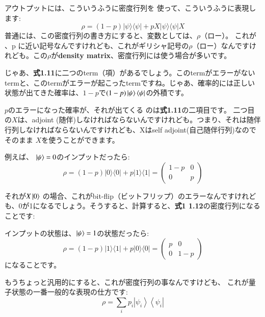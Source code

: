 アウトプットには、こういうふうに密度行列を
使って、こういうふうに表現します:
\begin{equation}
\rho=(1-p)|\psi\rangle\langle\psi|+p X| \psi\rangle\langle\psi| X
\end{equation}
普通には、この密度行列の書き方にすると、変数としては、$\rho$（ロー）。
これが 、p に近い記号なんですけれども、これがギリシャ記号の$\rho$（ロー）なんですけれども。この$\rho$が\textbf{density matrix}、密度行列には使う場合が多いです。

じゃあ、\textbf{式1.11}に二つのterm（項）があるでしょう。このtermがエラーがないtermと、このtermがエラーが起こったtermですね。じゃあ、確率的には正しい状態が出てきた確率は、$1-p$で$(1-p)\ket{\psi}\bra{\psi}$の外積です。

$p$のエラーになった確率が、それが出てくる
のは\textbf{式1.11}の二項目です。
二つ目の$X$は、adjoint (随伴)しなければならないんですけれども。つまり、それは随伴行列しなければならないんですけれども、Xはself adjoint(自己随伴行列)なのでそのまま
$X$を使うことができます。

例えば、
$\ket{\psi}=0$のインプットだったら:
\begin{equation}
\rho=(1-p)|0\rangle\langle 0|+p| 1\rangle\langle 1|=\left(\begin{array}{cc}
1-p & 0 \\
0 & p
\end{array}\right)
\end{equation}

それが$X\ket{0}$ の場合、これがbit-flip（ビットフリップ）のエラーなんですけれども、0が1になるでしょう。そうすると、計算すると、\textbf{式1 1.12}の密度行列になることです:

インプットの状態は、$\ket{\psi}=1$の状態だったら:
\begin{equation}
\rho=(1-p)|1\rangle\langle 1|+p| 0\rangle\langle 0|=\left(\begin{array}{cc}
p & 0 \\
0 & 1-p
\end{array}\right)
\end{equation}
になることです。

もうちょっと汎用的にすると、これが密度行列の事なんですけども、
これが量子状態の一番一般的な表現の仕方です:
\begin{equation}
\rho=\sum_{i} p_{i}\left|\psi_{i}\right\rangle\left\langle\psi_{i}\right|
\end{equation}

